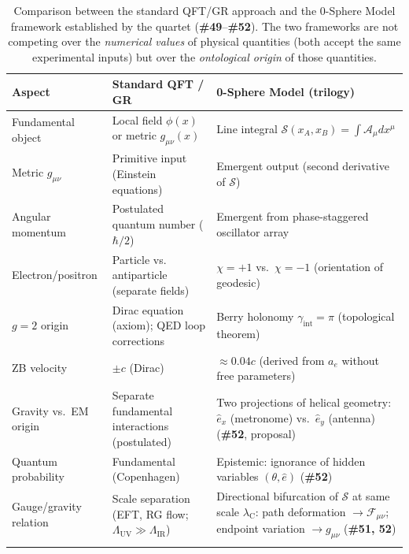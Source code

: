 \documentclass[12pt,letterpaper]{article}
\newcommand{\paperno}[1]{\textbf{\#{}#1}}
\newcommand{\lambdaC}{\lambda_{\mathrm{C}}}
\newcommand{\calS}{\mathcal{S}}
\newcommand{\calA}{\mathcal{A}}
\newcommand{\iphase}{\theta}
\newcommand{\ehat}[1]{\hat{e}_{#1}}
\begin{document}
\begin{table}[t!]
\centering
\renewcommand{\arraystretch}{1.4}
\begin{tabular}{p{4.0cm}p{5.0cm}p{4.0cm}}
\toprule
\textbf{Aspect} & \textbf{Standard QFT / GR} & \textbf{0-Sphere Model (trilogy)} \\
\midrule
Fundamental object &
  Local field $\phi(x)$ or metric $g_{\mu\nu}(x)$ &
  Line integral $\calS(x_A,x_B) = \int\calA_\mu dx^\mu$ \\
\addlinespace[0.2cm]
Metric $g_{\mu\nu}$ &
  Primitive input (Einstein equations) &
  Emergent output (second derivative of $\calS$) \\
\addlinespace[0.2cm]
Angular momentum &
  Postulated quantum number ($\hbar/2$) &
  Emergent from phase-staggered oscillator array \\
\addlinespace[0.2cm]
Electron/positron &
  Particle vs. antiparticle (separate fields) &
  $\chi=+1$ vs.\ $\chi=-1$ (orientation of geodesic) \\
\addlinespace[0.2cm]
$g=2$ origin &
  Dirac equation (axiom); QED loop corrections &
  Berry holonomy $\gamma_{\mathrm{int}}=\pi$ (topological theorem) \\
\addlinespace[0.2cm]
ZB velocity &
  $\pm c$ (Dirac) &
  $\approx 0.04c$ (derived from $a_e$ without free parameters) \\
\addlinespace[0.2cm]
Gravity vs.\ EM origin &
  Separate fundamental interactions (postulated) &
  Two projections of helical geometry: $\ehat{x}$ (metronome) vs.\ $\ehat{y}$ (antenna) (\paperno{52}, proposal) \\
\addlinespace[0.2cm]
Quantum probability &
  Fundamental (Copenhagen) &
  Epistemic: ignorance of hidden variables $(\iphase, \hat{e})$ (\paperno{52}) \\
\addlinespace[0.2cm]
Gauge/gravity relation &
  Scale separation (EFT, RG flow; $\Lambda_{\mathrm{UV}}\gg\Lambda_{\mathrm{IR}}$) &
  Directional bifurcation of $\calS$ at same scale $\lambdaC$: path deformation $\to\mathcal{F}_{\mu\nu}$; endpoint variation $\to g_{\mu\nu}$ (\paperno{51, 52}) \\
\addlinespace[0.2cm]
\bottomrule
\end{tabular}
\caption{Comparison between the standard QFT/GR approach and the 0-Sphere Model
framework established by the quartet (\paperno{49}--\paperno{52}).
The two frameworks are not competing over the \emph{numerical values} of physical
quantities (both accept the same experimental inputs) but over the
\emph{ontological origin} of those quantities.}
\label{tab:comparison}
\end{table}
\end{document}
